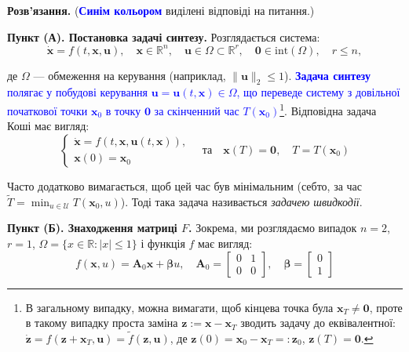 \documentclass{hw_template}
\begin{document}
\textbf{Розв'язання.} \scriptsize(\textcolor{blue}{\textbf{Синім кольором}} виділені відповіді на питання.)\normalsize

\textbf{Пункт (А). Постановка задачі синтезу.} Розглядається система:
\begin{equation*}
    \dot{\mathbf{x}} = f(t, \mathbf{x}, \mathbf{u}), \quad \mathbf{x} \in \mathbb{R}^n, \quad \mathbf{u} \in \Omega \subset \mathbb{R}^r, \quad \mathbf{0} \in \text{int}(\Omega), \quad r \leq n, 
\end{equation*}

де $\Omega$ --- обмеження на керування (наприклад, $\|\mathbf{u}\|_2 \leq 1$).
\textcolor{blue}{\textbf{Задача синтезу} полягає у побудові керування $\mathbf{u} =
\mathbf{u}(t,\mathbf{x}) \in \Omega$, що переведе систему з довільної початкової
точки $\mathbf{x}_0$ в точку $\mathbf{0}$ за скінченний час
$T(\mathbf{x}_0)$}\footnote{В загальному випадку, можна вимагати, щоб кінцева
точка була $\mathbf{x}_T \neq \mathbf{0}$, проте в такому випадку проста заміна
$\mathbf{z} := \mathbf{x} - \mathbf{x}_T$ зводить задачу до еквівалентної:
$\dot{\mathbf{z}} =
f(\mathbf{z}+\mathbf{x}_T,\mathbf{u})=\widetilde{f}(\mathbf{z},\mathbf{u})$, де
$\mathbf{z}(0) = \mathbf{x}_0-\mathbf{x}_T =: \mathbf{z}_0$, $\mathbf{z}(T) =
\mathbf{0}$.}. Відповідна задача Коші має вигляд:
\begin{equation*}
    \begin{cases}
        \dot{\mathbf{x}} = f(t, \mathbf{x}, \mathbf{u}(t,\mathbf{x})), \\
        \mathbf{x}(0) = \mathbf{x}_0
    \end{cases} \quad \text{та} \quad \mathbf{x}(T) = \mathbf{0}, \quad T = T(\mathbf{x}_0)
\end{equation*}

Часто додатково вимагається, щоб цей час був мінімальним (себто, за час
$\widetilde{T} = \min_{u \in \mathcal{U}}T(\mathbf{x}_0, u)$). Тоді така 
задача називається \textit{задачею швидкодії}.

\textbf{Пункт (Б). Знаходження матриці $F$.} Зокрема, ми розглядаємо випадок
$n=2$, $r=1$, $\Omega = \{x \in \mathbb{R}: |x| \leq 1\}$ і функція $f$ має вигляд:
\begin{equation*}
    f(\mathbf{x}, u) = \boldsymbol{A}_0\mathbf{x} + \boldsymbol{\beta}u, \quad \boldsymbol{A}_0 = \begin{bmatrix}
        0 & 1 \\
        0 & 0
    \end{bmatrix}, \quad \boldsymbol{\beta} = \begin{bmatrix}
        0 \\ 1
    \end{bmatrix}
\end{equation*}
\end{document}

